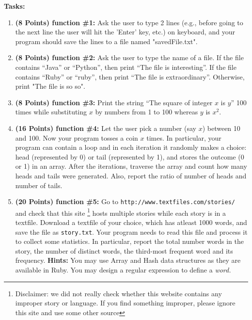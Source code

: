 \documentclass[paper=letter, fontsize=11pt]{scrartcl} %
\begin{document}
    \textbf{Tasks:}
    \begin{enumerate}[noitemsep]

        \item \textbf{(8 Points) function \#1:} Ask the user to type 2 lines (e.g., before going to the next line the user will hit the 'Enter' key, etc.) 
on keyboard, and your program should save the lines to a file named "savedFile.txt".
        \item \textbf{(8 Points) function \#2:} Ask the user to type the name of a file. If the file contains ``Java'' or ``Python'', 
then print ``The file is interesting''. If the file contains ``Ruby'' or ``ruby'', then print ``The file is extraordinary''. Otherwise, print "The file is so so". 
        \item \textbf{(8 Points) function \#3:} Print the string ``The square of integer $x$ is $y$'' 100 times while substituting $x$ 
by numbers from 1 to 100 whereas $y$ is $x^2$.
        \item \textbf{(16 Points) function \#4:} Let the user pick a number (say $x$) between 10 and 100. Now your program tosses a coin $x$ times. 
In particular, your program can contain a loop and in each iteration it randomly makes a choice: head (represented by 0) or 
tail (represented by 1), and stores the outcome (0 or 1) 
in an array. After the iterations, traverse the array and count how many heads and tails were generated. 
Also, report the ratio of number of heads and number of tails.

        \item \textbf{(20 Points) function \#5:} Go to \texttt{http://www.textfiles.com/stories/} and check that this site 
\footnote {Disclaimer: we did not really check whether this website contains any improper story or language. 
If you find something improper, please ignore this site and use some other source} hosts multiple stories 
while each story is in a textfile. Download a textfile of your choice, which has atleast 1000 words, 
and save the file as \texttt{story.txt}. Your program needs to read this file and process it to 
collect some statistics. In particular, report the total number words in the story, the number of distinct words, 
the third-most frequent word and its frequency. 
\textbf {Hints:} You may use Array and Hash data structures as they are available in Ruby. You may design a regular expression to define a \em{word}.  

    \end{enumerate}
 
\end{document}
